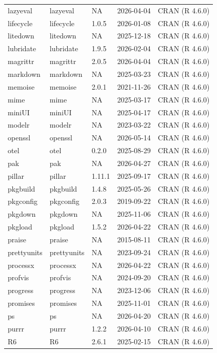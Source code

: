 \documentclass[
]{book}
\begin{document}
\begin{tabular}{lllll}
lazyeval & lazyeval & NA & 2026-04-04 & CRAN (R 4.6.0)\\
\addlinespace
lifecycle & lifecycle & 1.0.5 & 2026-01-08 & CRAN (R 4.6.0)\\
litedown & litedown & NA & 2025-12-18 & CRAN (R 4.6.0)\\
lubridate & lubridate & 1.9.5 & 2026-02-04 & CRAN (R 4.6.0)\\
magrittr & magrittr & 2.0.5 & 2026-04-04 & CRAN (R 4.6.0)\\
markdown & markdown & NA & 2025-03-23 & CRAN (R 4.6.0)\\
\addlinespace
memoise & memoise & 2.0.1 & 2021-11-26 & CRAN (R 4.6.0)\\
mime & mime & NA & 2025-03-17 & CRAN (R 4.6.0)\\
miniUI & miniUI & NA & 2025-04-17 & CRAN (R 4.6.0)\\
modelr & modelr & NA & 2023-03-22 & CRAN (R 4.6.0)\\
openssl & openssl & NA & 2026-05-14 & CRAN (R 4.6.0)\\
\addlinespace
otel & otel & 0.2.0 & 2025-08-29 & CRAN (R 4.6.0)\\
pak & pak & NA & 2026-04-27 & CRAN (R 4.6.0)\\
pillar & pillar & 1.11.1 & 2025-09-17 & CRAN (R 4.6.0)\\
pkgbuild & pkgbuild & 1.4.8 & 2025-05-26 & CRAN (R 4.6.0)\\
pkgconfig & pkgconfig & 2.0.3 & 2019-09-22 & CRAN (R 4.6.0)\\
\addlinespace
pkgdown & pkgdown & NA & 2025-11-06 & CRAN (R 4.6.0)\\
pkgload & pkgload & 1.5.2 & 2026-04-22 & CRAN (R 4.6.0)\\
praise & praise & NA & 2015-08-11 & CRAN (R 4.6.0)\\
prettyunits & prettyunits & NA & 2023-09-24 & CRAN (R 4.6.0)\\
processx & processx & NA & 2026-04-22 & CRAN (R 4.6.0)\\
\addlinespace
profvis & profvis & NA & 2024-09-20 & CRAN (R 4.6.0)\\
progress & progress & NA & 2023-12-06 & CRAN (R 4.6.0)\\
promises & promises & NA & 2025-11-01 & CRAN (R 4.6.0)\\
ps & ps & NA & 2026-04-20 & CRAN (R 4.6.0)\\
purrr & purrr & 1.2.2 & 2026-04-10 & CRAN (R 4.6.0)\\
\addlinespace
R6 & R6 & 2.6.1 & 2025-02-15 & CRAN (R 4.6.0)\\

\end{tabular}
\end{document}
